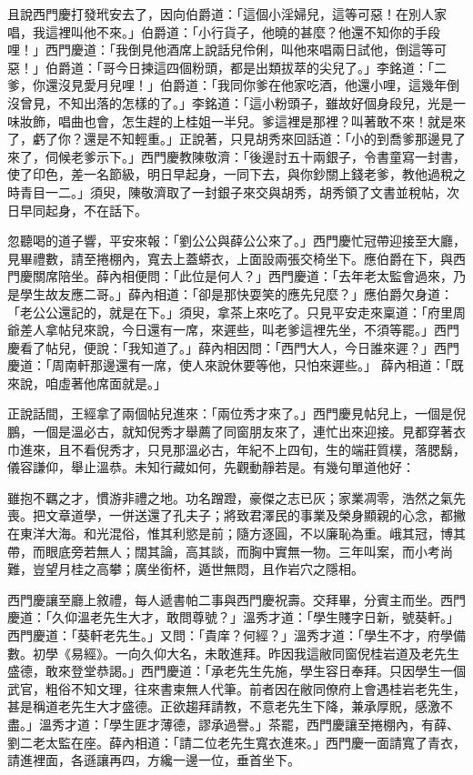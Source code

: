 且說西門慶打發玳安去了，因向伯爵道：「這個小淫婦兒，這等可惡！在別人家唱，我這裡叫他不來。」伯爵道：「小行貨子，他曉的甚麼？他還不知你的手段哩！」西門慶道：「我倒見他酒席上說話兒伶俐，叫他來唱兩日試他，倒這等可惡！」伯爵道：「哥今日揀這四個粉頭，都是出類拔萃的尖兒了。」李銘道：「二爹，你還沒見愛月兒哩！」伯爵道：「我同你爹在他家吃酒，他還小哩，這幾年倒沒曾見，不知出落的怎樣的了。」李銘道：「這小粉頭子，雖故好個身段兒，光是一味妝飾，唱曲也會，怎生趕的上桂姐一半兒。爹這裡是那裡？叫著敢不來！就是來了，虧了你？還是不知輕重。」正說著，只見胡秀來回話道：「小的到喬爹那邊見了來了，伺候老爹示下。」西門慶教陳敬濟：「後邊討五十兩銀子，令書童寫一封書，使了印色，差一名節級，明日早起身，一同下去，與你鈔關上錢老爹，教他過稅之時青目一二。」須臾，陳敬濟取了一封銀子來交與胡秀，胡秀領了文書並稅帖，次日早同起身，不在話下。

忽聽喝的道子響，平安來報：「劉公公與薛公公來了。」西門慶忙冠帶迎接至大廳，見畢禮數，請至捲棚內，寬去上蓋蟒衣，上面設兩張交椅坐下。應伯爵在下，與西門慶關席陪坐。薛內相便問：「此位是何人？」西門慶道：「去年老太監會過來，乃是學生故友應二哥。」薛內相道：「卻是那快耍笑的應先兒麼？」應伯爵欠身道：「老公公還記的，就是在下。」須臾，拿茶上來吃了。只見平安走來稟道：「府里周爺差人拿帖兒來說，今日還有一席，來遲些，叫老爹這裡先坐，不須等罷。」西門慶看了帖兒，便說：「我知道了。」薛內相因問：「西門大人，今日誰來遲？」西門慶道：「周南軒那邊還有一席，使人來說休要等他，只怕來遲些。」 薛內相道：「既來說，咱虛著他席面就是。」

正說話間，王經拿了兩個帖兒進來：「兩位秀才來了。」西門慶見帖兒上，一個是倪鵬，一個是溫必古，就知倪秀才舉薦了同窗朋友來了，連忙出來迎接。見都穿著衣巾進來，且不看倪秀才，只見那溫必古，年紀不上四旬，生的端莊質樸，落腮鬍，儀容謙仰，舉止溫恭。未知行藏如何，先觀動靜若是。有幾句單道他好：

雖抱不羈之才，慣游非禮之地。功名蹭蹬，豪傑之志已灰；家業凋零，浩然之氣先喪。把文章道學，一併送還了孔夫子；將致君澤民的事業及榮身顯親的心念，都撇在東洋大海。和光混俗，惟其利慾是前；隨方逐圓，不以廉恥為重。峨其冠，博其帶，而眼底旁若無人；闊其論，高其談，而胸中實無一物。三年叫案，而小考尚難，豈望月桂之高攀；廣坐銜杯，遁世無悶，且作岩穴之隱相。

西門慶讓至廳上敘禮，每人遞書帕二事與西門慶祝壽。交拜畢，分賓主而坐。西門慶道：「久仰溫老先生大才，敢問尊號？」溫秀才道：「學生賤字日新，號葵軒。」西門慶道：「葵軒老先生。」又問：「貴庠？何經？」溫秀才道：「學生不才，府學備數。初學《易經》。一向久仰大名，未敢進拜。昨因我這敝同窗倪桂岩道及老先生盛德，敢來登堂恭謁。」西門慶道：「承老先生先施，學生容日奉拜。只因學生一個武官，粗俗不知文理，往來書柬無人代筆。前者因在敝同僚府上會遇桂岩老先生，甚是稱道老先生大才盛德。正欲趨拜請教，不意老先生下降，兼承厚貺，感激不盡。」溫秀才道：「學生匪才薄德，謬承過譽。」茶罷，西門慶讓至捲棚內，有薛、劉二老太監在座。薛內相道：「請二位老先生寬衣進來。」西門慶一面請寬了青衣，請進裡面，各遜讓再四，方纔一邊一位，垂首坐下。

